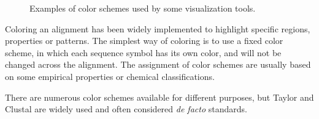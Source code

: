 \begin{figure}[hbt]
\centering
{}
\caption[Some Nucleotide and Amino Acid Color Schemes]{Examples of color schemes used by some visualization tools. \cite{Procter2010aa}}\label{fig:procter-2bc}
\end{figure}

Coloring an alignment has been widely implemented to highlight specific regions, properties or patterns. The simplest way of coloring is to use a fixed color scheme, in which each sequence symbol has its own color, and will not be changed across the alignment. The assignment of color schemes are usually based on some empirical properties or chemical classifications.

There are numerous color schemes available for different purposes, but Taylor \cite{LIN2002361} and Clustal \cite{Thompsonaa} are widely used and often considered \emph{de facto} standards.

